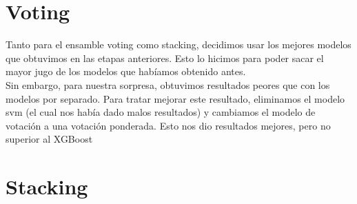 \documentclass{article}
\begin{document}
\section*{Voting} 
Tanto para el ensamble voting como stacking, decidimos usar los mejores modelos que obtuvimos en las etapas anteriores. Esto lo hicimos para poder sacar el mayor jugo de los modelos que habíamos obtenido antes. \\
Sin embargo, para nuestra sorpresa, obtuvimos resultados peores que con los modelos por separado. Para tratar mejorar este resultado, eliminamos el modelo svm (el cual nos había dado malos resultados) y cambiamos el modelo de votación a una votación ponderada. Esto nos dio resultados mejores, pero no superior al XGBoost


\section*{Stacking} 
\end{document}
